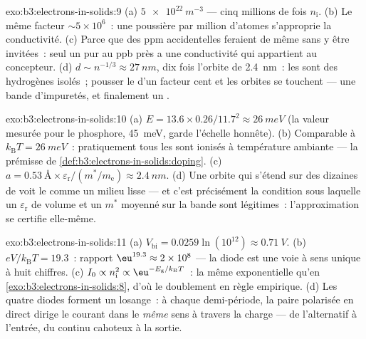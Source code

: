\begin{solution}{exo:b3:electrons-in-solids:9}
(a) $\qty{5e22}{m^{-3}}$ --- cinq millions de fois $n_{\text{i}}$.
(b) Le même facteur $\sim5\times10^6$~: une poussière par million
d'atomes s'approprie la conductivité. (c) Parce que des ppm
accidentelles feraient de même sans y être invitées~: seul un
 pur au ppb près a une conductivité qui appartient au
concepteur. (d) $d \sim n^{-1/3}
\approx \qty{27}{nm}$, dix fois l'orbite de \qty{2.4}{nm}~: les
 sont des hydrogènes isolés~; pousser le  d'un facteur
cent et les orbites se touchent --- une bande d'impuretés, et
finalement un .
\end{solution}

\begin{solution}{exo:b3:electrons-in-solids:10}
(a) $E = 13.6\times0.26/11.7^2 \approx \qty{26}{meV}$ (la valeur
mesurée pour le phosphore, \qty{45}{meV}, garde l'échelle honnête).
(b) Comparable à $k_{\text{B}}T = \qty{26}{meV}$~: pratiquement
tous les  sont ionisés à température ambiante --- la
prémisse de \cref{def:b3:electrons-in-solids:doping}. (c) $a =
\qty{0.53}{\angstrom}\times\varepsilon_{\text{r}}/(m^*/
m_{\text{e}}) \approx \qty{2.4}{nm}$. (d) Une orbite qui s'étend sur
des dizaines de  voit le  comme un milieu lisse ---
et c'est précisément la condition sous laquelle un
$\varepsilon_{\text{r}}$ de volume et un $m^*$ moyenné sur la bande
sont légitimes~: l'approximation se certifie elle-même.
\end{solution}

\begin{solution}{exo:b3:electrons-in-solids:11}
(a) $V_{\text{bi}} = 0.0259\ln(10^{12}) \approx \qty{0.71}{V}$.
(b) $eV/k_{\text{B}}T = 19.3$~: rapport $\eu^{19.3} \approx
2\times10^{8}$ --- la diode est une voie à sens unique à huit
chiffres. (c) $I_0 \propto n_{\text{i}}^2 \propto
\eu^{-E_{\text{g}}/k_{\text{B}}T}$~: la même exponentielle qu'en
\cref{exo:b3:electrons-in-solids:8}, d'où le doublement en règle
empirique. (d) Les quatre diodes forment un losange~: à chaque
demi-période, la paire polarisée en direct dirige le courant dans le
\emph{même} sens à travers la charge --- de l'alternatif à l'entrée,
du continu cahoteux à la sortie.
\end{solution}


